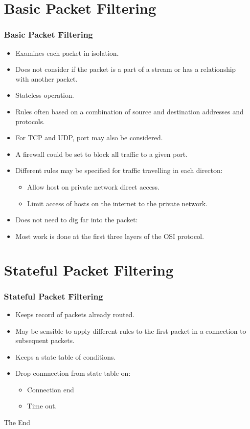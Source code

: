 \documentclass{beamer}
\begin{document}
\section{Basic Packet Filtering}
\begin{frame}
\frametitle{Basic Packet Filtering}
\begin{itemize}
\item Examines each packet in isolation.
\item Does not consider if the packet is a part of a stream or has a relationship with another packet.
\item Stateless operation.
\item Rules often based on a combination of source and destination addresses and protocols.
\item For TCP and UDP, port may also be considered.
\item A firewall could be set to block all traffic to a given port.
\item Different rules may be specified for traffic travelling in each directon:
\begin{itemize}
\item Allow host on private network direct access.
\item Limit access of hosts on the internet to the private network.
\end{itemize}
\item Does not need to dig far into the packet:
\item Most work is done at the first three layers of the OSI protocol.
\end{itemize}
\end{frame}
\section{Stateful Packet Filtering}
\begin{frame}
\frametitle{Stateful Packet Filtering}
\begin{itemize}
\item Keeps record of packets already routed.
\item May be sensible to apply different rules to the first packet in a connection to subsequent packets.
\item Keeps a state table of conditions.
\item Drop connnection from state table on:
\begin{itemize}
\item Connection end
\item Time out.
\end{itemize}
\end{itemize}
\end{frame}
\begin{frame} 
\Huge{\centerline{The End}}
\end{frame}
\end{document}
